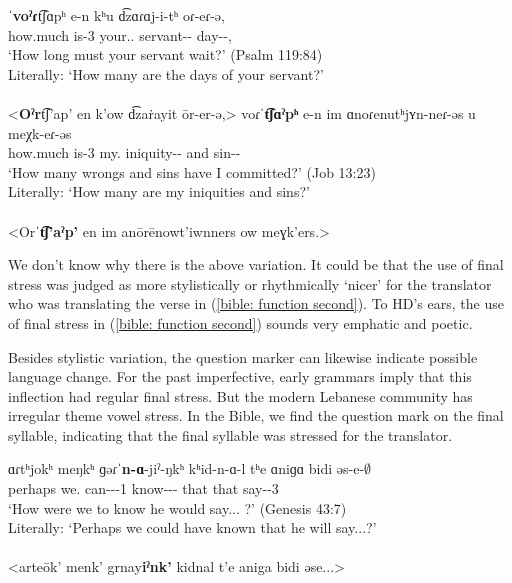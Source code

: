\begin{exe}
	\ex 
	\begin{xlist}
		\ex \gll ˈ\textbf{voˀɾ}t͡ʃɑpʰ e-n kʰu d͡zɑɾɑj-i-tʰ oɾ-eɾ-ə,  \\
		how.much is-3{\pl} your.{\sg}.{\gen} servant-{\gen}-{\possSsg} day-{\pl}-{},  \\
		\trans `How long must your servant wait?' \hfill (Psalm 119:84) \label{bible: function initial} \\
		Literally: `How many are the days of your servant?'\\
		 \\
		<\textbf{Oˀr}t͡ʃ'ap' en k'ow d͡za\.{r}ayit  ōr-er-ə,>
		\ex \gll voɾˈ\textbf{t͡ʃɑˀpʰ} e-n im ɑnoɾenutʰjʏn-neɾ-əs u meχk-eɾ-əs \\
		how.much is-3{\pl} my.{\gen} iniquity-{\pl}-{\possFsg} and sin-{\pl}-{\possFsg} \\
		\trans `How many wrongs and sins have I committed?' \hfill  (Job 13:23) \label{bible: function second}\\
		Literally: `How many are my iniquities and sins?'\\
		\\ <Orˈ\textbf{t͡ʃ'aˀp'} en im anōrēnowt'iwnners ow meɣk'ers.> 
	\end{xlist}
\end{exe}

We don't know why there is the above variation. It could be that the use of final stress was judged as more stylistically or rhythmically `nicer' for the translator who was translating the verse in (\ref{bible: function second}). To HD's ears, the use of final stress in (\ref{bible: function second}) sounds very emphatic and poetic. 

Besides stylistic variation, the question marker can likewise indicate possible language change. For the   past imperfective, early grammars imply that this inflection had regular final stress. But the modern Lebanese community has  irregular theme vowel stress. In the Bible, we find the question mark on the final syllable, indicating that the final syllable was stressed for the translator. 

\begin{exe}
	\ex \gll ɑɾtʰjokʰ meŋkʰ ɡəɾˈ\textbf{n-ɑ}-jiˀ-ŋkʰ kʰid-n-ɑ-l tʰe ɑniɡɑ bidi əs-e-$\emptyset$ \\
	perhaps we.{\nom} can-{\thgloss}-{\pst}-1{\pl} know-{\inch}-{\thgloss}-{\infgloss} that that {\fut} say-{\thgloss}-3{\sg} \\
	\trans `How were we to know he would say... ?' \hfill (Genesis 43:7)\\
	Literally: `Perhaps we could have known that he will say...?' 
	\\ 
	\\ <arteōk' menk' grnay\textbf{iˀnk'} kidnal t'e aniga bidi əse...> 
	
\end{exe}

